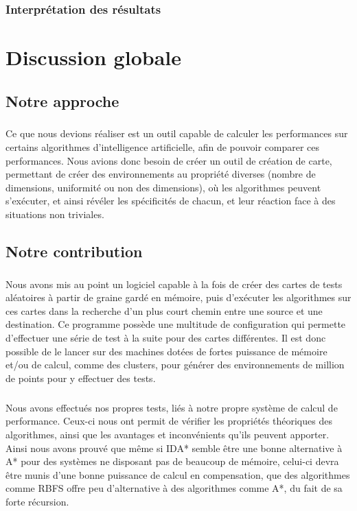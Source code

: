 \documentclass[pidr]{tnreport}
\begin{document}
		\subsection{Interprétation des résultats}

\chapter{Discussion globale}

\section{Notre approche}
\paragraph{}
Ce que nous devions réaliser est un outil capable de calculer les performances sur certains algorithmes d'intelligence artificielle, afin de pouvoir comparer ces performances. Nous avions donc besoin de créer un outil de création de carte, permettant de créer des environnements au propriété diverses (nombre de dimensions, uniformité ou non des dimensions), où les algorithmes peuvent s'exécuter, et ainsi révéler les spécificités de chacun, et leur réaction face à des situations non triviales.  

\section{Notre contribution}
\paragraph{}
Nous avons mis au point un logiciel capable à la fois de créer des cartes de tests aléatoires à partir de graine gardé en mémoire, puis d'exécuter les algorithmes sur ces cartes dans la recherche d'un plus court chemin entre une source et une destination. Ce programme possède une multitude de configuration qui permette d'effectuer une série de test à la suite pour des cartes différentes. Il est donc possible de le lancer sur des machines dotées de fortes puissance de mémoire et/ou de calcul, comme des clusters, pour générer des environnements de million de points pour y effectuer des tests.

\paragraph{}
Nous avons effectués nos propres tests, liés à notre propre système de calcul de performance. Ceux-ci nous ont permit de vérifier les propriétés théoriques des algorithmes, ainsi que les avantages et inconvénients qu'ils peuvent apporter. Ainsi nous avons prouvé que même si IDA* semble être une bonne alternative à A* pour des systèmes ne disposant pas de beaucoup de mémoire, celui-ci devra être munis d'une bonne puissance de calcul en compensation, que des algorithmes comme RBFS offre peu d'alternative à des algorithmes comme A*, du fait de sa forte récursion.   
\end{document}
